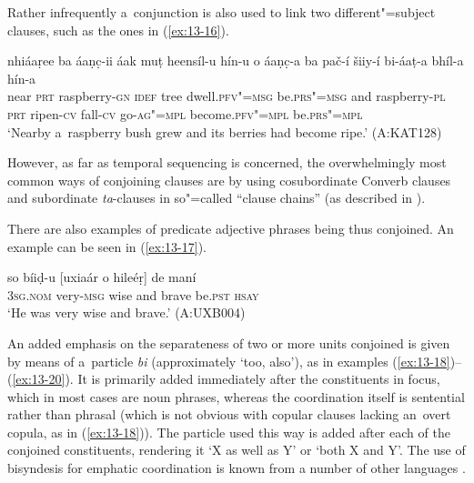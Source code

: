 Rather infrequently a~conjunction is also used to link two different"=subject clauses, such as the ones in (\ref{ex:13-16}).

\begin{exe}
\ex
\label{ex:13-16}
\gll nhiáaṛee ba áaṇc̣-ii áak muṭ heensíl-u hín-u o áaṇc̣-a ba pač-í šiiy-í bi-áaṭ-a bhíl-a hín-a \\
near \textsc{prt} raspberry-\textsc{gn} \textsc{idef} tree dwell.\textsc{pfv"=msg}  be.\textsc{prs"=msg} and raspberry-\textsc{pl} \textsc{prt} ripen-\textsc{cv} fall-\textsc{cv} go-\textsc{ag"=mpl} become.\textsc{pfv"=mpl} be.\textsc{prs"=mpl} \\
\glt `Nearby a~raspberry bush grew and its berries had become ripe.' (A:KAT128) 
\end{exe}

However, as far as temporal sequencing is concerned, the overwhelmingly most common ways of conjoining clauses are by using cosubordinate Converb clauses and subordinate \textit{ta}-clauses in so"=called ``clause chains'' (as described in ).


There are also examples of predicate adjective phrases being thus conjoined. An example can be seen in (\ref{ex:13-17}).

\begin{exe}
\ex
\label{ex:13-17}
\gll so bíiḍ-u [uxiaár o hileéṛ] de maní  \\
\textsc{3sg.nom} very-\textsc{msg} wise and brave be.\textsc{pst} \textsc{hsay} \\
\glt `He was very wise and brave.' (A:UXB004) 
\end{exe}

 An added emphasis on the separateness of two or more units conjoined is given by means of a~particle \textit{bi} (approximately `too, also'), as in examples (\ref{ex:13-18})--(\ref{ex:13-20}). It is primarily added immediately after the constituents in focus, which in most cases are noun phrases, whereas the coordination itself is sentential rather than phrasal (which is not obvious with copular clauses lacking an~overt copula, as in (\ref{ex:13-18})). The particle used this way is added after each of the conjoined constituents, rendering it `X as well as Y' or `both X and Y'. The use of bisyndesis for emphatic coordination is known from a number of other languages \citep[15--17]{haspelmath2007}. 

